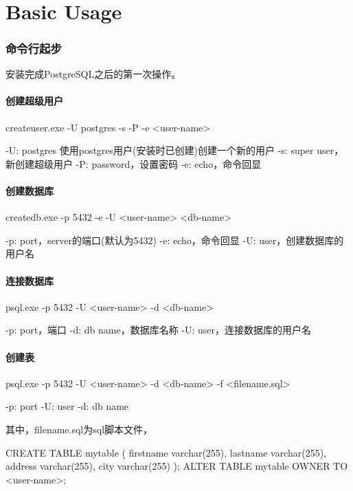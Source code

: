 \documentclass[a4paper,11pt]{article}
\begin{document}
\tt %
\pagestyle{header}
\sybmaketitle
\tableofcontents
\newpage

\pagestyle{main}
\setcounter{page}{1}

\part[Basic Usage]{Basic Usage}
\section[命令行起步]{命令行起步}
安装完成PostgreSQL之后的第一次操作。
\subsection[创建超级用户]{创建超级用户}
\begin{bashcode}
  createuser.exe -U postgres -s -P -e <user-name>
  
  -U: postgres 使用postgres用户(安装时已创建)创建一个新的用户
  -s: super user，新创建超级用户
  -P: password，设置密码
  -e: echo，命令回显
\end{bashcode}

\subsection[创建数据库]{创建数据库}
\begin{bashcode}
  createdb.exe -p 5432 -e -U <user-name> <db-name>

  -p: port，server的端口(默认为5432)
  -e: echo，命令回显
  -U: user，创建数据库的用户名
\end{bashcode}

\subsection[连接数据库]{连接数据库}
\begin{bashcode}
  psql.exe -p 5432 -U <user-name> -d <db-name>

  -p: port，端口
  -d: db name，数据库名称
  -U: user，连接数据库的用户名
\end{bashcode}
\subsection[创建表]{创建表}
\begin{bashcode}
  psql.exe -p 5432 -U <user-name> -d <db-name> -f <filename.sql>

  -p: port
  -U: user
  -d: db name
\end{bashcode}

其中，filename.sql为sql脚本文件，

\begin{sqlcode}
CREATE TABLE mytable (
  firstname varchar(255),
  lastname varchar(255),
  address varchar(255),
  city varchar(255)
);
ALTER TABLE mytable OWNER TO <user-name>;
\end{sqlcode}
\end{document}
